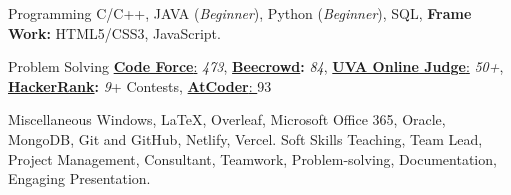 

\begin{cvskills}

  \cvskill
    {Programming} %
   {C/C++, JAVA (\textit{Beginner}), Python (\textit{Beginner}), SQL, \textbf{Frame Work:} HTML5/CSS3, JavaScript.} %

  \cvskill
    {Problem Solving} %
     {\href{https://codeforces.com/profile/sorowarmahabub1709vip}{\textbf{Code Force}:} \textit{473},  \textbf{\href{https://www.beecrowd.com.br/judge/en/profile/446714}{Beecrowd}:} \textit{84}, \href{https://onlinejudge.org/index.php?option=com_comprofiler&Itemid=3}{\textbf{UVA Online Judge}:} \textit{50+}, \textbf{\href{https://www.hackerrank.com/C201032_Sorowar?hr_r=1}{HackerRank}:} \textit{9}+ Contests, \href{https://atcoder.jp/users/sorowar_mahabub}{\textbf{AtCoder}: }93} %

  \cvskill
    {Miscellaneous} %
    {Windows, LaTeX, Overleaf, Microsoft Office 365, Oracle, MongoDB, Git and GitHub, Netlify, Vercel.} %
  \cvskill
    {Soft Skills} %
    {Teaching, Team Lead, Project Management, Consultant, Teamwork, Problem-solving, Documentation, Engaging Presentation.} %

\end{cvskills}
